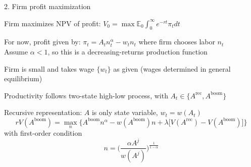 \documentclass[11pt, aspectratio=169]{beamer}
\newenvironment{witemize}{\itemize\addtolength{\itemsep}{10pt}}{\enditemize}
\begin{document}
\begin{frame}{2. Firm profit maximization}

{\small
\begin{witemize}
\item Firm maximizes NPV of profit: $V_0 = \max \mathbb{E}_0 \int_0^\infty e^{- r t} \pi_t dt$

\item For now, profit given by: $\pi_t = A_t n_t^\alpha - w_t n_t$ where firm chooses labor $n_t$ \\
Assume $\alpha < 1$, so this is a decreasing-returns production function

\item Firm is small and takes wage $\{ w_t \}$ as given (wages determined in general equilibrium)

\item Productivity follows two-state high-low process, with $A_t \in \{ A^\text{rec}, A^\text{boom} \}$

\item Recursive representation: $A$ is only state variable, $w_t = w(A_t)$
\begin{equation*}
	r V(A^\text{boom}) = \max_n \Big\{ A^\text{boom} n^\alpha - w(A^\text{boom}) n + \lambda \Big[ V(A^\text{rec}) - V(A^\text{boom}) \Big] \Big\}
\end{equation*}
with first-order condition
\begin{equation*}
	n = \bigg(\frac{\alpha A^j}{w(A^j)}\bigg)^\frac{1}{1-\alpha}
\end{equation*}

\end{witemize}
}
\end{frame}
\end{document}
